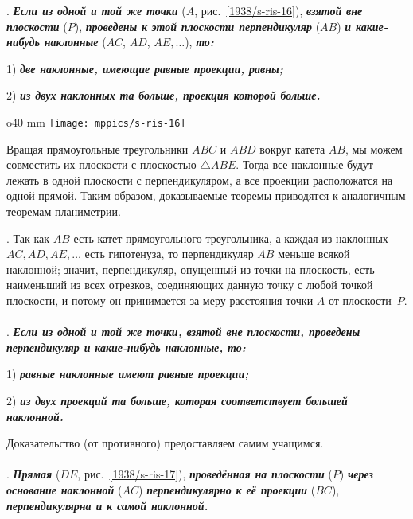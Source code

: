 .
\textbf{\emph{Если из одной и той же точки}} ($A$, рис.~\ref{1938/s-ris-16}), \textbf{\emph{взятой вне плоскости}} ($P$), \textbf{\emph{проведены к этой плоскости перпендикуляр}} ($AB$) \textbf{\emph{и какие-нибудь наклонные}} ($AC$, $AD$, $AE,\dots$), \textbf{\emph{то:}}

1) \textbf{\emph{две наклонные, имеющие равные проекции, равны;}}

2) \textbf{\emph{из двух наклонных та больше, проекция которой больше.}} 

\begin{wrapfigure}{o}{40 mm}
\centering
\texttt{[image: mppics/s-ris-16]}
\caption{}\label{1938/s-ris-16}
\end{wrapfigure}

Вращая прямоугольные треугольники $ABC$ и $ABD$ вокруг катета $AB$, мы можем совместить их плоскости с плоскостью $\triangle ABE$.
Тогда все наклонные будут лежать в одной плоскости с перпендикуляром, а все проекции расположатся на одной прямой.
Таким образом, доказываемые теоремы приводятся к аналогичным теоремам планиметрии.

\medskip

\mbox{.}
Так как $AB$ есть катет прямоугольного треугольника, а каждая из наклонных $AC, AD, AE,\dots$ есть гипотенуза, то перпендикуляр $AB$ меньше всякой наклонной;
значит, перпендикуляр, опущенный из точки на плоскость, есть наименьший из всех отрезков, соединяющих данную точку с любой точкой плоскости, и потому он принимается за меру расстояния точки $A$ от плоскости~$P$.

\paragraph{}\label{1938/s27}
.
\textbf{\emph{Если из одной и той же точки, взятой вне плоскости, проведены перпендикуляр и какие-нибудь наклонные, то: }}

1) \textbf{\emph{равные наклонные имеют равные проекции;}}

2) \textbf{\emph{из двух проекций та больше, которая соответствует большей наклонной.}}

Доказательство (от противного) предоставляем самим учащимся.

\paragraph{}\label{1938/s28}.
\textbf{\emph{Прямая}} ($DE$, рис.~\ref{1938/s-ris-17}), \textbf{\emph{проведённая на плоскости}} ($P$) \textbf{\emph{через основание наклонной}} ($AC$) \textbf{\emph{перпендикулярно к её проекции}} ($BC$), \textbf{\emph{перпендикулярна и к самой наклонной.}}

